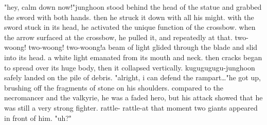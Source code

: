 "hey, calm down now!"junghoon stood behind the head of the statue and grabbed the sword with both hands.
 then he struck it down with all his might.
with the sword stuck in its head, he activated the unique function of the crossbow.
when the arrow surfaced at the crossbow, he pulled it, and repeatedly at that.
two-woong! two-woong! two-woong!a beam of light glided through the blade and slid into its head.
 a white light emanated from its mouth and neck.
 then cracks began to spread over its huge body, then it collapsed vertically.
kugugugugu-junghoon safely landed on the pile of debris.
"alright, i can defend the rampart…"he got up, brushing off the fragments of stone on his shoulders.
 compared to the necromancer and the valkyrie, he was a faded hero, but his attack showed that he was still a very strong fighter.
rattle- rattle-at that moment two giants appeared in front of him.
 "uh?"

 